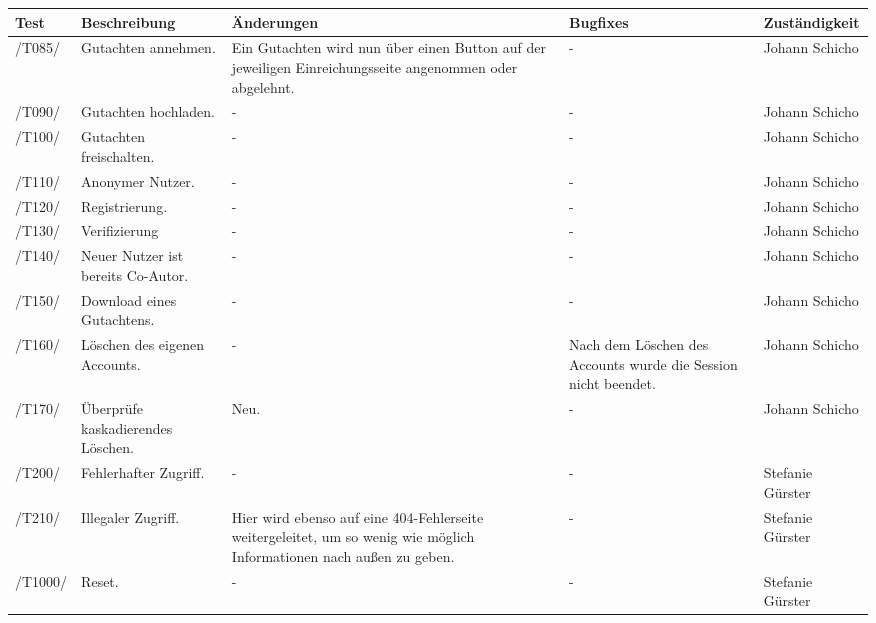 \begin{table}[H]
	\centering
	\begin{tabular}{m{1.2cm}|m{3cm}|m{3.5cm}|m{3.5cm}|l}
		\toprule
		\textbf{Test} & \textbf{Beschreibung} & \textbf{Änderungen} & \textbf{Bugfixes} & \textbf{Zuständigkeit} \\\midrule
		/T085/ & Gutachten annehmen. & Ein Gutachten wird nun über einen Button auf der jeweiligen Einreichungsseite angenommen oder abgelehnt. & - & Johann Schicho \\\midrule
		/T090/ & Gutachten hochladen. & - & - & Johann Schicho \\\midrule
		/T100/ & Gutachten freischalten. & - & - & Johann Schicho \\\midrule
		/T110/ & Anonymer Nutzer. & - & - & Johann Schicho \\\midrule
		/T120/ & Registrierung. & - & - & Johann Schicho \\\midrule
		/T130/ & Verifizierung & - & - & Johann Schicho \\\midrule
		/T140/ & Neuer Nutzer ist bereits Co-Autor. & - & - & Johann Schicho \\\midrule
		/T150/ & Download eines Gutachtens. & - & - & Johann Schicho \\\midrule
		/T160/ & Löschen des eigenen Accounts. & - & Nach dem Löschen des Accounts wurde die Session nicht beendet. & Johann Schicho \\\midrule
		/T170/ & Überprüfe kaskadierendes Löschen. & Neu. & - & Johann Schicho \\\midrule
		/T200/ & Fehlerhafter Zugriff. & - & - & Stefanie Gürster \\\midrule
		/T210/ & Illegaler Zugriff. & Hier wird ebenso auf eine 404-Fehlerseite weitergeleitet, um so wenig wie möglich Informationen nach außen zu geben. & - & Stefanie Gürster \\\midrule
		/T1000/ & Reset. & - & - & Stefanie Gürster
	\end{tabular}
\end{table}
